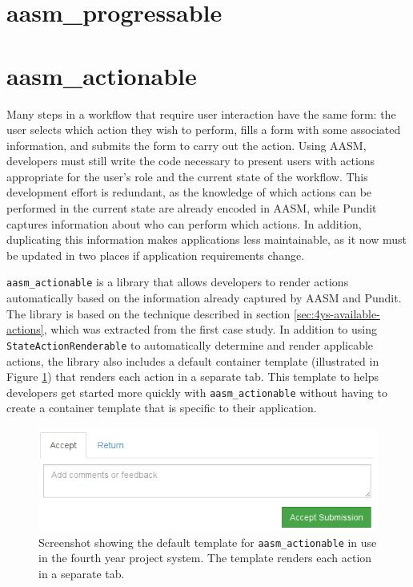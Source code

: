 \documentclass[document.tex]{subfiles}
\begin{document}
\section {aasm\_progressable}




\section {aasm\_actionable}

Many steps in a workflow that require user interaction have the same form: the user selects which action they wish to perform, fills a form with some associated information, and submits the form to carry out the action. Using AASM, developers must still write the code necessary to present users with actions appropriate for the user's role and the current state of the workflow. This development effort is redundant, as the knowledge of which actions can be performed in the current state are already encoded in AASM, while Pundit captures information about who can perform which actions. In addition, duplicating this information makes applications less maintainable, as it now must be updated in two places if application requirements change.

\verb!aasm_actionable! \cite{aasm_actionable} is a library that allows developers to render actions automatically based on the information already captured by AASM and Pundit. The library is based on the technique described in section \ref{sec:4ys-available-actions}, which was extracted from the first case study. In addition to using \verb!StateActionRenderable! to automatically determine and render applicable actions, the library also includes a default container template (illustrated in Figure \ref{fig:aasm-actionable-example}) that renders each action in a separate tab. This template to helps developers get started more quickly with \verb!aasm_actionable! without having to create a container template that is specific to their application.

\begin{figure}[!htbp]
  \centering
  \includegraphics[width=5in]{./img/platform/aasm-actionable-example}
  \cprotect
  \caption{Screenshot showing the default template for \verb!aasm_actionable! in use in the fourth year project system. The template renders each action in a separate tab.}
  \label{fig:aasm-actionable-example}
\end{figure}
\end{document}
